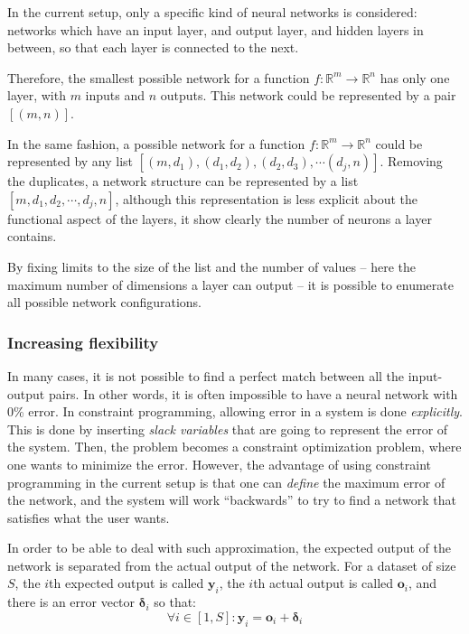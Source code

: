 \documentclass[a4paper, 10pt]{article}
\begin{document}
In the current setup, only a specific kind of neural networks is considered:
networks which have an input layer, and output layer, and hidden layers in
between, so that each layer is connected to the next.

Therefore, the smallest possible network for a function $f : \mathbb{R}^m
\rightarrow \mathbb{R}^n$ has only one layer, with $m$ inputs and $n$ outputs. 
This network could be represented by a pair $[(m,n)]$.

In the same fashion, a possible network for a function $f : \mathbb{R}^m \rightarrow
\mathbb{R}^n$ could be represented by any list $[(m, d_1),(d_1, d_2), (d_2,
d_3), \cdots (d_j, n)]$. Removing the duplicates, a network structure can be
represented by a list $[m, d_1, d_2, \cdots, d_j, n]$, although this
representation is less explicit about the functional aspect of the layers, it
show clearly the number of neurons a layer contains.

By fixing limits to the size of the list and the number of values -- here the
maximum number of dimensions a layer can output -- it is possible to enumerate
all possible network configurations.

\subsubsection*{Increasing flexibility}
In many cases, it is not possible to find a perfect match between all the
input-output pairs. In other words, it is often impossible to have a neural
network with 0\% error. In constraint programming, allowing error in a system is
done \emph{explicitly}. This is done by inserting \emph{slack variables}
that are going to represent the error of the system. Then, the problem becomes a
constraint optimization problem, where one wants to minimize the error.
However, the advantage of using constraint programming in the current setup is
that one can \emph{define} the maximum error of the network, and the system will work
``backwards'' to try to find a network that satisfies what the user
wants.

In order to be able to deal with such approximation, the expected output of the
network is separated from the actual output of the network. For a dataset of
size $S$, the $i$th expected output is called $\mathbf{y}_i$, the $i$th actual
output is called $\mathbf{o}_i$, and there is an error vector
$\boldsymbol{\delta}_i$ so that: 
\begin{equation*} 
    \forall i
    \in [1, S] : \mathbf{y}_i = \mathbf{o}_i + \boldsymbol{\delta}_i 
\end{equation*}
\end{document}
